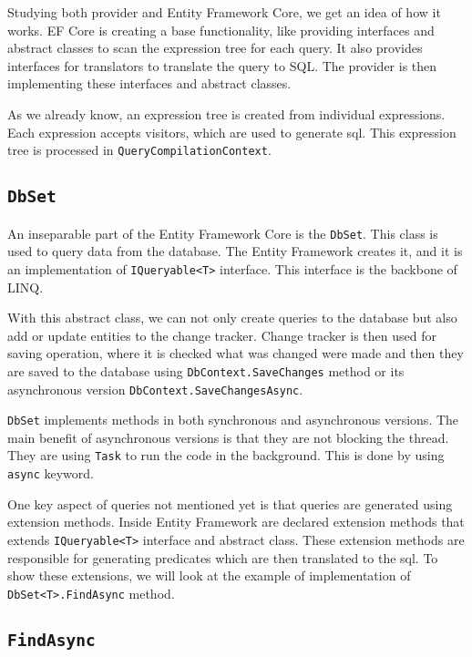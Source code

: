 Studying both provider and Entity Framework Core, we get an idea of how it works. EF Core is creating a base functionality, like providing interfaces and abstract classes to scan
the expression tree for each query. It also provides interfaces for translators to translate the query to SQL. The provider is then implementing these interfaces and abstract classes.

As we already know, an expression tree is created from individual expressions. Each expression accepts visitors, which are used to generate \acrshort{sql}.
This expression tree is processed in
\linebreak\texttt{QueryCompilationContext}.

\subsection {\texttt{DbSet}}

An inseparable part of the Entity Framework Core is the \texttt{DbSet}. This class is used to query data from the database.
The Entity Framework creates it, and it is an implementation of \texttt{IQueryable<T>} interface. This interface is the backbone of LINQ.

With this abstract class, we can not only create queries to the database but also add or update entities to the change tracker.
Change tracker is then used for saving operation, where it is checked what was changed were made and then they are saved to the database using \texttt{DbContext.SaveChanges} method
or its asynchronous version \texttt{DbContext.SaveChangesAsync}.

\texttt{DbSet} implements methods in both synchronous and asynchronous versions. The main benefit of asynchronous versions is that they are not blocking the thread. They are using \texttt{Task} to run the code in the background. This is done by using \texttt{async} keyword.

One key aspect of queries not mentioned yet is that queries are generated using extension methods. Inside Entity Framework are declared extension methods that
extends \texttt{IQueryable<T>} interface and  abstract class. These extension methods are responsible for generating predicates which are then translated to the \acrshort{sql}.
To show these extensions, we will look at the example of implementation of \texttt{DbSet<T>.FindAsync} method.

\subsection{\texttt{FindAsync}}

